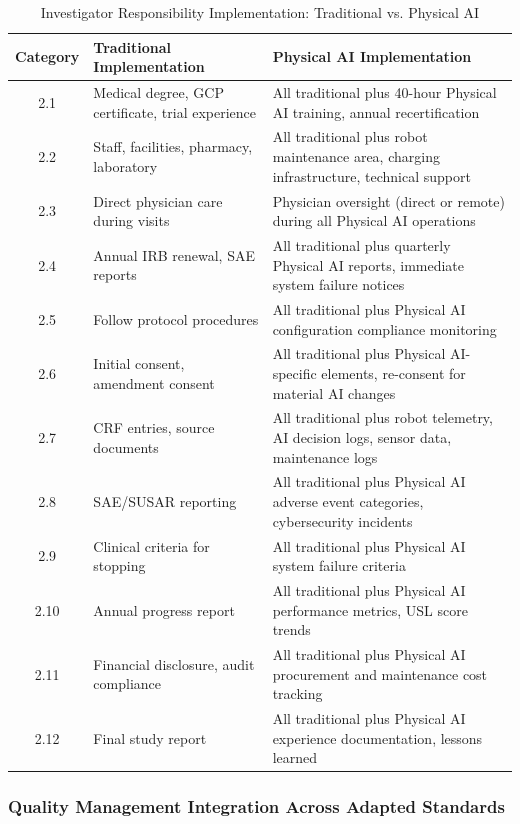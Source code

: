 \begin{table}[H]
\centering
\caption{Investigator Responsibility Implementation: Traditional vs. Physical AI}
\label{tab:investigator-implementation}
\small
\begin{tabularx}{\textwidth}{c X X}
\toprule
\textbf{Category} & \textbf{Traditional Implementation} & \textbf{Physical AI Implementation} \\
\midrule
2.1 & Medical degree, GCP certificate, trial experience & All traditional plus 40-hour Physical AI training, annual recertification \\
2.2 & Staff, facilities, pharmacy, laboratory & All traditional plus robot maintenance area, charging infrastructure, technical support \\
2.3 & Direct physician care during visits & Physician oversight (direct or remote) during all Physical AI operations \\
2.4 & Annual IRB renewal, SAE reports & All traditional plus quarterly Physical AI reports, immediate system failure notices \\
2.5 & Follow protocol procedures & All traditional plus Physical AI configuration compliance monitoring \\
2.6 & Initial consent, amendment consent & All traditional plus Physical AI-specific elements, re-consent for material AI changes \\
2.7 & CRF entries, source documents & All traditional plus robot telemetry, AI decision logs, sensor data, maintenance logs \\
2.8 & SAE/SUSAR reporting & All traditional plus Physical AI adverse event categories, cybersecurity incidents \\
2.9 & Clinical criteria for stopping & All traditional plus Physical AI system failure criteria \\
2.10 & Annual progress report & All traditional plus Physical AI performance metrics, USL score trends \\
2.11 & Financial disclosure, audit compliance & All traditional plus Physical AI procurement and maintenance cost tracking \\
2.12 & Final study report & All traditional plus Physical AI experience documentation, lessons learned \\
\bottomrule
\end{tabularx}
\end{table}

\subsubsection{Quality Management Integration Across Adapted Standards}

